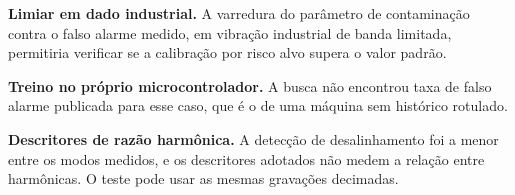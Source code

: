 \textbf{Limiar em dado industrial.} A varredura do parâmetro de contaminação contra o falso alarme medido,
em vibração industrial de banda limitada, permitiria verificar se a calibração por risco alvo supera o
valor padrão.

\textbf{Treino no próprio microcontrolador.} A busca não encontrou taxa de falso alarme publicada para esse
caso, que é o de uma máquina sem histórico rotulado.

\textbf{Descritores de razão harmônica.} A detecção de desalinhamento foi a menor entre os modos medidos, e
os descritores adotados não medem a relação entre harmônicas. O teste pode usar as mesmas gravações
decimadas.
